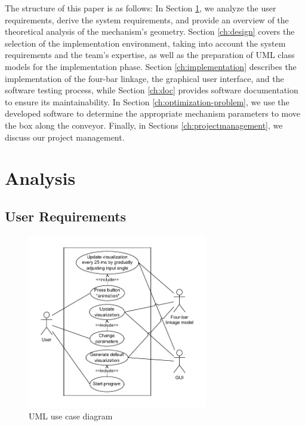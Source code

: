\documentclass{article}
\begin{document}
The structure of this paper is as follows: In Section \ref{ch:analysis}, we analyze the user requirements, derive the system requirements, and provide an overview of the theoretical analysis of the mechanism’s geometry. Section \ref{ch:design} covers the selection of the implementation environment, taking into account the system requirements and the team's expertise, as well as the preparation of UML class models for the implementation phase. Section \ref{ch:implementation} describes the implementation of the four-bar linkage, the graphical user interface, and the software testing process, while Section \ref{ch:doc} provides software documentation to ensure its maintainability. In Section \ref{ch:optimization-problem}, we use the developed software to determine the appropriate mechanism parameters to move the box along the conveyor. Finally, in Sections \ref{ch:projectmanagement}, we discuss our project management.


\section{Analysis} \label{ch:analysis}

\subsection{User Requirements}

\begin{figure}[h]
	\centering
	\includegraphics[width=0.7\textwidth]{./figures/uml_use_case.pdf}
	\caption{UML use case diagram}
	\label{fig:use_case}
\end{figure}
\end{document}
